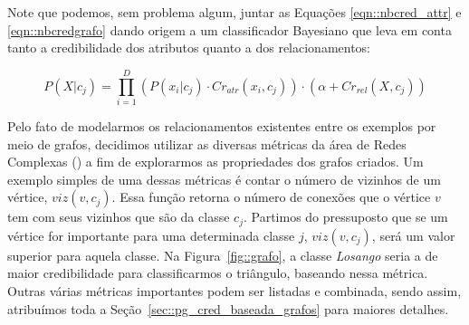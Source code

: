 

Note que podemos, sem problema algum, juntar as Equações \ref{eqn::nbcred_attr} e \ref{eqn::nbcredgrafo} dando origem a um classificador Bayesiano que leva em conta tanto a credibilidade dos atributos quanto a dos relacionamentos:

\begin{equation}\label{eqn::nbcredcompleta}
P(X|c_{j}) = \prod^{D}_{i=1}{(P(x_i|c_j) \cdot Cr_{atr}(x_i,c_j)) \cdot (\alpha + Cr_{rel}(X,c_j)) } 
\end{equation}

Pelo fato de modelarmos os relacionamentos existentes entre os exemplos por meio de grafos, decidimos utilizar as diversas métricas da área de Redes Complexas (\cite{Newman03}) a fim de explorarmos as propriedades dos grafos criados. Um exemplo simples de uma dessas métricas é contar o número de vizinhos de um vértice, $viz(v,c_j)$. Essa função retorna o número de conexões  que o vértice $v$ tem com seus vizinhos que são da classe $c_j$. Partimos do pressuposto que se um vértice for importante para uma determinada classe $j$, $viz(v,c_j)$, será um valor superior para aquela classe. Na Figura~\ref{fig::grafo}, a classe \textit{Losango} seria a de maior credibilidade para classificarmos o triângulo, baseando nessa métrica. Outras várias métricas importantes podem ser listadas e combinada, sendo assim, atribuímos toda a Seção~\ref{sec::pg_cred_baseada_grafos} para maiores detalhes.  


